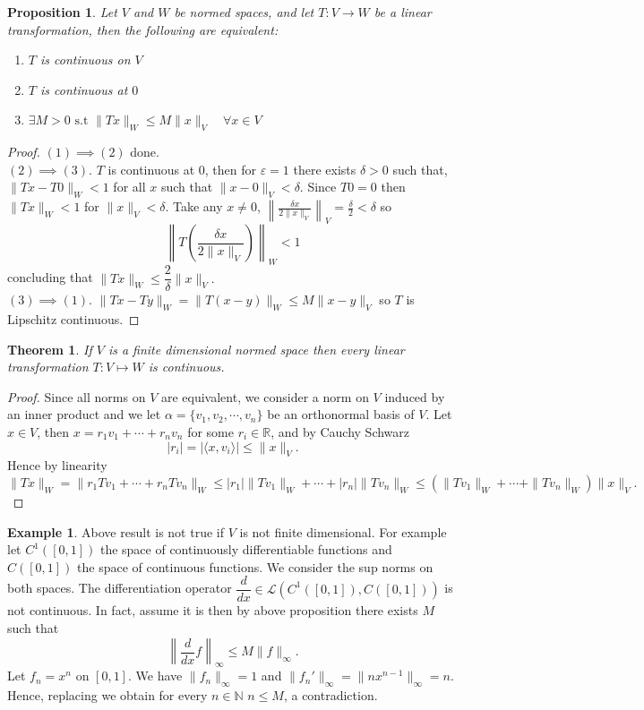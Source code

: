 \documentclass[11pt,openany]{book}
\theoremstyle{plain}
\newtheorem{theorem}{Theorem}[chapter]
\newtheorem{proposition}{Proposition}[chapter]
\theoremstyle{definition}
\newtheorem{example}{Example}[chapter]
\theoremstyle{remark}
\newcommand{\eps}{\varepsilon}
\begin{document}
\begin{proposition}
    Let $V$ and $W$ be normed spaces, and let $T: V \to W$ be a linear transformation, then the following are equivalent: \begin{enumerate}
        \item $T$ is continuous on $V$
        \item $T$ is continuous at $0$
        \item $\exists M>0 \text{ s.t } \|Tx\|_W \leq  M \|x\|_V \quad \forall x \in V $
    \end{enumerate}
\end{proposition}

\begin{proof}
    $(1) \implies (2)$ done.\\
    $(2) \implies (3)$. $T$ is continuous at 0, then for $\eps =1$ there exists $\delta >0$ such that, $\|Tx -T0\|_W < 1$ for all $x$ such that $\|x-0\|_V < \delta$. Since $T0=0$ then $\|Tx\|_W< 1$ for $\|x\|_V < \delta$. Take any $x \ne 0$, $\left\|\frac{\delta x}{2\|x\|_V}\right\|_V = \frac{\delta}{2}<\delta$ so \[\left\|T\left(\frac{\delta x}{2\|x\|_V}\right)\right\|_W < 1\] concluding that $\|Tx\|_W\leq \dfrac{2}{\delta}\|x\|_V.$\\
    $(3) \implies (1).$ $\|Tx-Ty\|_W = \|T(x-y)\|_W \le M\|x-y\|_V$ so $T$ is Lipschitz continuous.
\end{proof}
\begin{theorem}
    If $V$ is a finite dimensional normed space then every linear transformation $T:V\mapsto W$ is continuous.
\end{theorem}

\begin{proof}
    Since all norms on $V$ are equivalent, we consider a norm on $V$ induced by an inner product and we let $\alpha=\{v_1,v_2,\cdots,v_n\}$ be an orthonormal basis of $V$. Let $x\in V$, then $x=r_1v_1+\cdots+r_nv_n$ for some $r_i\in \mathbb R$, and by Cauchy Schwarz 
    $$|r_i|=|\langle x,v_i\rangle|\leq \|x\|_V.$$
    Hence by linearity
    $$\|Tx\|_W=\|r_1Tv_1+\cdots+r_n Tv_n\|_{W}\leq |r_1|\|Tv_1\|_W+\cdots+|r_n|\|Tv_n\|_W\leq \left(\|Tv_1\|_W+\cdots+\|Tv_n\|_W\right) \|x\|_V.$$

\end{proof}

\begin{example}
    Above result is not true if $V$ is not finite dimensional. For example let $C^1([0,1])$ the space of continuously differentiable functions and $C([0,1])$ the space of continuous functions. We consider the sup norms on both spaces. The differentiation operator 
    $\dfrac{d}{dx}\in \mathcal L(C^1([0,1]), C([0,1]))$ is not continuous. In fact, assume it is then by above proposition there exists $M$ such that 
    $$\left\|\dfrac{d}{dx}f\right\|_\infty\leq M \|f\|_{\infty}.$$
    Let $f_n=x^n$ on $[0,1]$. We have $\|f_n\|_{\infty}=1$ and $\|f_n'\|_{\infty}=\|nx^{n-1}\|_{\infty}=n.$
    Hence, replacing we obtain for every $n\in \mathbb N$
    $n\leq M$, a contradiction.
\end{example}
\end{document}
